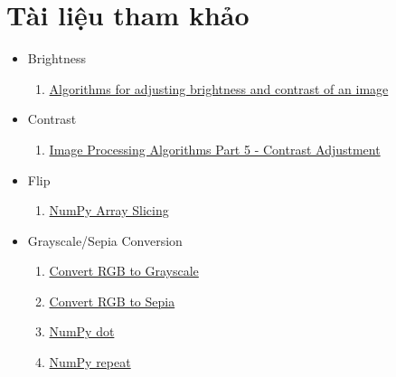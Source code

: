 \documentclass{article}
\begin{document}
\section{Tài liệu tham khảo}
\begin{itemize}
  \item Brightness
  \begin{enumerate}
    \item \href{https://ie.nitk.ac.in/blog/2020/01/19/algorithms-for-adjusting-brightness-and-contrast-of-an-image/}{Algorithms for adjusting brightness and contrast of an image}
  \end{enumerate}
  \item Contrast
  \begin{enumerate}
      \item \href{https://www.dfstudios.co.uk/articles/programming/image-programming-algorithms/image-processing-algorithms-part-5-contrast-adjustment/}{Image Processing Algorithms Part 5 - Contrast Adjustment}
  \end{enumerate}
  \item Flip
  \begin{enumerate}
      \item \href{https://www.w3schools.com/python/numpy/numpy_array_slicing.asp}{NumPy Array Slicing}
  \end{enumerate}
  \item Grayscale/Sepia Conversion
  \begin{enumerate}
    \item \href{https://www.tutorialspoint.com/dip/grayscale_to_rgb_conversion.htm}{Convert RGB to Grayscale}
    \item \href{https://www.geeksforgeeks.org/image-processing-in-java-colored-image-to-sepia-image-conversion/}{Convert RGB to Sepia}
    \item \href{https://numpy.org/doc/stable/reference/generated/numpy.dot.html}{NumPy dot}
    \item \href{https://numpy.org/doc/stable/reference/generated/numpy.repeat.html}{NumPy repeat}
  \end{enumerate} 
\end{itemize}
\end{document}
